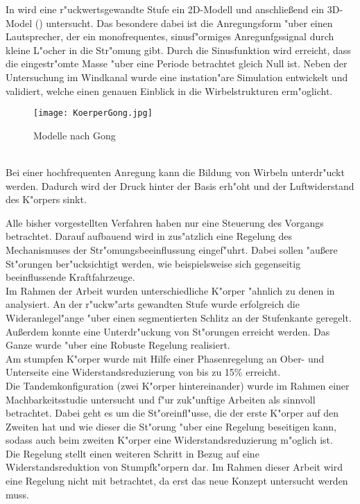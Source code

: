 In \cite{Gong.2015} wird eine r"uckwertsgewandte Stufe ein 2D-Modell und anschlie\ss{}end ein 3D-Model () untersucht. Das besondere dabei ist die Anregungsform "uber einen Lautsprecher, der ein monofrequentes, sinusf"ormiges Anregunfgssignal durch kleine L"ocher in die Str"omung gibt. Durch die Sinusfunktion wird erreicht, dass die eingestr"omte Masse "uber eine Periode betrachtet gleich Null ist. Neben der Untersuchung im Windkanal wurde eine instation"are Simulation entwickelt und validiert, welche einen genauen Einblick in die Wirbelstrukturen erm"oglicht.
\begin{figure}[h]
	\centering
	\texttt{[image: KoerperGong.jpg]}
	\caption{Modelle nach Gong \cite{Gong.2015}}
	\label{fig:Gong}
\end{figure}\\
Bei einer hochfrequenten Anregung kann die Bildung von Wirbeln unterdr"uckt werden. Dadurch wird der Druck hinter der Basis erh"oht und der Luftwiderstand des K"orpers sinkt.

Alle bisher vorgestellten Verfahren haben nur eine Steuerung des Vorgangs betrachtet. Darauf aufbauend wird in \cite{Henning.2008} zus"atzlich eine Regelung des Mechanismuses der Str"omungsbeeinflussung eingef"uhrt. Dabei sollen "au\ss{}ere St"orungen ber"ucksichtigt werden, wie beispielsweise sich gegenseitig beeinflussende Kraftfahrzeuge.\\
Im Rahmen der Arbeit \cite{Henning.2008} wurden unterschiedliche K"orper "ahnlich zu denen in  analysiert.
An der r"uckw"arts gewandten Stufe wurde erfolgreich die Wideranlegel"ange "uber einen segmentierten Schlitz an der Stufenkante geregelt. Au\ss{}erdem konnte eine Unterdr"uckung von St"orungen erreicht werden. Das Ganze wurde "uber eine Robuste Regelung realisiert.\\
Am stumpfen K"orper wurde mit Hilfe einer Phasenregelung an Ober- und Unterseite eine Widerstandsreduzierung von bis zu 15\% erreicht.\\
Die Tandemkonfiguration (zwei K"orper hintereinander) wurde im Rahmen einer Machbarkeitsstudie \cite{Henning.2008} untersucht und f"ur zuk"unftige Arbeiten als sinnvoll betrachtet. Dabei geht es um die St"oreinfl"usse, die der erste K"orper auf den Zweiten hat und wie dieser die St"orung "uber eine Regelung beseitigen kann, sodass auch beim zweiten K"orper eine Widerstandsreduzierung m"oglich ist.\\
Die Regelung stellt einen weiteren Schritt in Bezug auf eine Widerstandsreduktion von Stumpfk"orpern dar. Im Rahmen dieser Arbeit wird eine Regelung nicht mit betrachtet, da erst das neue Konzept untersucht werden muss.
